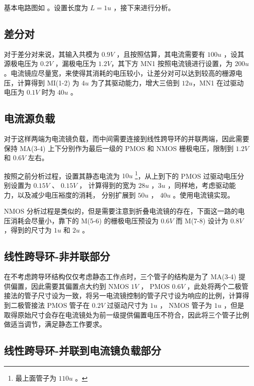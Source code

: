 \documentclass[lang=cn,11pt,a4paper,cite=authoryear]{elegantpaper}
\begin{document}
基本电路图如  。设置长度为 \(L = 1u\) ，接下来进行分析。




\subsection{差分对}

对于差分对来说，其输入共模为 \(0.9 V\) ，且按照估算，其电流需要有 \(100 u\) ，设其源极电压为 \(0.2 V\) ，漏极电压为 \(1.2V\)，其下方  MN1 按照电流镜进行设置，为 \(200 u\) 。电流镜应尽量宽，来使得其消耗的电压较小，让差分对可以达到较高的栅源电压，计算得到 MI(1-2) 为 \(4 u\) 为了其驱动能力，增大三倍到 \(12 u\)，MN1 在过驱动电压为 \(0.1 V\) 时为 \(40 u\) 。

\subsection{电流源负载} 

对于这样两端为电流镜负载，而中间需要连接到线性跨导环的并联两端，因此需要保持 MA(3-4) 上下分别作为最后一级的 PMOS 和 NMOS 栅极电压，限制到 \(1.2 V\) 和 \(0.6 V\) 左右。

按照之前分析过程，设置其静态电流为 \(10 u\) \footnote{最上面管子为 \(110 u\) 。}，从上到下的 PMOS 过驱动电压分别设置为 \(0.15 V\) 、 \(0.15 V\) ， 计算得到的宽为 \(28 u\) ，\(3 u\) ，同样地，考虑驱动能力，以及减少电压裕度的消耗， 分别扩展到 \(50 u\) ， \(40 u\) 。使用电流镜实现。

NMOS 分析过程是类似的，但是需要注意到折叠电流镜的存在，下面这一路的电压消耗会尽量小，靠下的 M(5-6) 的栅极电压预设为 \(0.6 V\) 而 M(7-8) 设计为 \(0.8 V\) ，得到的尺寸为 \(1 u\) 和 \(2 u\) 。

\subsection{线性跨导环-非并联部分} 

在不考虑跨导环结构仅仅考虑静态工作点时，三个管子的结构是为了 MA(3-4) 提供偏置，因此需要其偏置点大约到 NMOS \(1 V\) ， PMOS \(0.6 V\) ，此处将两个二极管接法的管子尺寸设为一致，将另一电流镜控制的管子尺寸设为响应的比例，计算得到二极管接法 PMOS 管子在 \(0.2 V\) 过驱动尺寸为 \(1 u\) ， NMOS 管子为 \(1 u\) ，但是取得原始尺寸会存在电流镜处为前一级提供偏置电压不符合，因此将三个管子比例做适当调节，满足静态工作要求。

\subsection{线性跨导环-并联到电流镜负载部分} 
\end{document}
